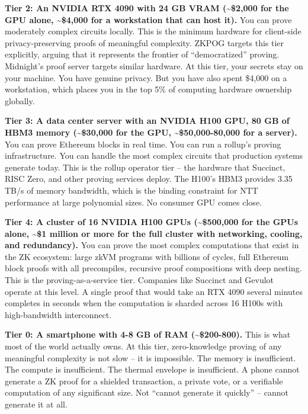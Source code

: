 \documentclass[
  11pt,
  openany]{report}
\renewcommand{\textbf}[1]{{\bfseries\color{MidnightBold}#1}}
\begin{document}
\textbf{Tier 2: An NVIDIA RTX 4090 with 24 GB VRAM (\textasciitilde\$2,000 for
the GPU alone, \textasciitilde\$4,000 for a workstation that can host it).} You
can prove moderately complex circuits locally. This is the minimum hardware for
client-side privacy-preserving proofs of meaningful complexity. ZKPOG targets
this tier explicitly, arguing that it represents the frontier of
``democratized'' proving. Midnight's proof server targets similar hardware. At
this tier, your secrets stay on your machine. You have genuine privacy. But you
have also spent \$4,000 on a workstation, which places you in the top 5\% of
computing hardware ownership globally.

\textbf{Tier 3: A data center server with an NVIDIA H100 GPU, 80 GB of HBM3
memory (\textasciitilde\$30,000 for the GPU, \textasciitilde\$50,000-80,000 for
a server).} You can prove Ethereum blocks in real time. You can run a rollup's
proving infrastructure. You can handle the most complex circuits that production
systems generate today. This is the rollup operator tier -- the hardware that
Succinct, RISC Zero, and other proving services deploy. The H100's HBM3 provides
3.35 TB/s of memory bandwidth, which is the binding constraint for NTT
performance at large polynomial sizes. No consumer GPU comes close.

\textbf{Tier 4: A cluster of 16 NVIDIA H100 GPUs (\textasciitilde\$500,000 for
the GPUs alone, \textasciitilde\$1 million or more for the full cluster with
networking, cooling, and redundancy).} You can prove the most complex
computations that exist in the ZK ecosystem: large zkVM programs with billions
of cycles, full Ethereum block proofs with all precompiles, recursive proof
compositions with deep nesting. This is the proving-as-a-service tier. Companies
like Succinct and Gevulot operate at this level. A single proof that would take
an RTX 4090 several minutes completes in seconds when the computation is sharded
across 16 H100s with high-bandwidth interconnect.

\textbf{Tier 0: A smartphone with 4-8 GB of RAM (\textasciitilde\$200-800).}
This is what most of the world actually owns. At this tier, zero-knowledge
proving of any meaningful complexity is not slow -- it is impossible. The memory
is insufficient. The compute is insufficient. The thermal envelope is
insufficient. A phone cannot generate a ZK proof for a shielded transaction, a
private vote, or a verifiable computation of any significant size. Not ``cannot
generate it quickly'' -- cannot generate it at all.
\end{document}
